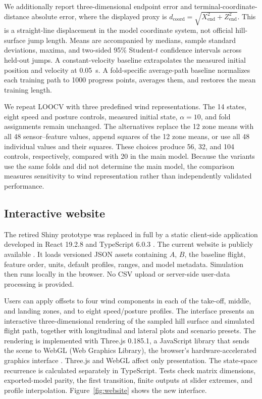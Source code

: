 \documentclass[11pt,twoside,a4paper]{article}
\begin{document}
We additionally report three-dimensional endpoint error and terminal-coordinate-distance absolute error, where the displayed proxy is $d_{\mathrm{coord}}=\sqrt{X_{\mathrm{end}}^2+Z_{\mathrm{end}}^2}$. This is a straight-line displacement in the model coordinate system, not official hill-surface jump length. Means are accompanied by medians, sample standard deviations, maxima, and two-sided 95\% Student-$t$ confidence intervals across held-out jumps. A constant-velocity baseline extrapolates the measured initial position and velocity at 0.05~s. A fold-specific average-path baseline normalizes each training path to 1000 progress points, averages them, and restores the mean training length.

We repeat LOOCV with three predefined wind representations. The 14 states, eight speed and posture controls, measured initial state, $\alpha=10$, and fold assignments remain unchanged. The alternatives replace the 12 zone means with all 48 sensor--feature values, append squares of the 12 zone means, or use all 48 individual values and their squares. These choices produce 56, 32, and 104 controls, respectively, compared with 20 in the main model. Because the variants use the same folds and did not determine the main model, the comparison measures sensitivity to wind representation rather than independently validated performance.

\subsection{Interactive website}\label{sec:website}

The retired Shiny prototype was replaced in full by a static client-side application developed in React 19.2.8 and TypeScript 6.0.3 \cite{react2026,typescript2026}. The current website is publicly available \cite{hegler2026website}. It loads versioned JSON assets containing $A$, $B$, the baseline flight, feature order, units, default profiles, ranges, and model metadata. Simulation then runs locally in the browser. No CSV upload or server-side user-data processing is provided.

Users can apply offsets to four wind components in each of the take-off, middle, and landing zones, and to eight speed/posture profiles. The interface presents an interactive three-dimensional rendering of the sampled hill surface and simulated flight path, together with longitudinal and lateral plots and scenario presets. The rendering is implemented with Three.js 0.185.1, a JavaScript library that sends the scene to WebGL (Web Graphics Library), the browser's hardware-accelerated graphics interface \cite{threejs2026,webgl2026}. Three.js and WebGL affect only presentation. The state-space recurrence is calculated separately in TypeScript. Tests check matrix dimensions, exported-model parity, the first transition, finite outputs at slider extremes, and profile interpolation. Figure~\ref{fig:website} shows the new interface.
\end{document}
